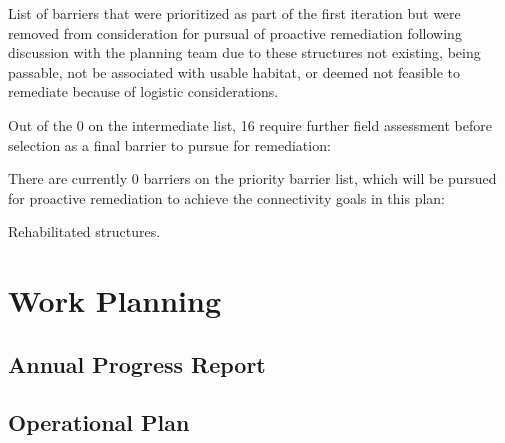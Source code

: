 \documentclass[
  letterpaper,
  DIV=11,
  numbers=noendperiod]{scrreprt}
\begin{document}
\begin{table}

\caption{\label{tbl-remove}List of barriers that were prioritized as
part of the first iteration but were removed from consideration for
pursual of proactive remediation following discussion with the planning
team due to these structures not existing, being passable, not be
associated with usable habitat, or deemed not feasible to remediate
because of logistic considerations.}


\end{table}%

Out of the 0 on the intermediate list, 16 require further field
assessment before selection as a final barrier to pursue for
remediation:

There are currently 0 barriers on the priority barrier list, which will
be pursued for proactive remediation to achieve the connectivity goals
in this plan:

\begin{table}

\caption{\label{tbl-rehab}Rehabilitated structures.}


\end{table}%


\chapter*{Work Planning}\label{work-planning}


\section*{Annual Progress Report}\label{annual-progress-report}


\section*{Operational Plan}\label{operational-plan}
\end{document}
